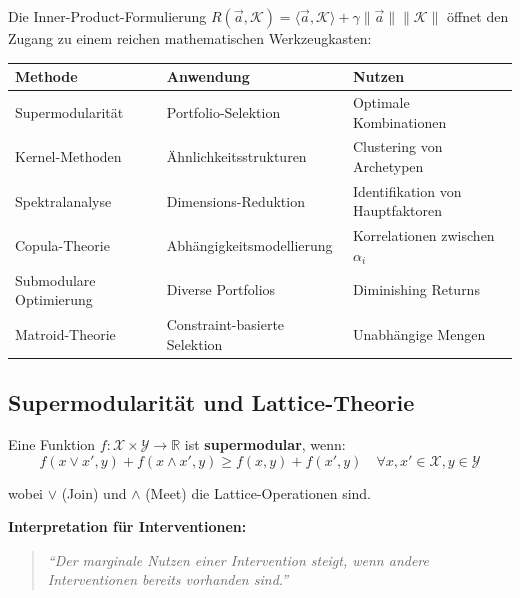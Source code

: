 \begin{tcolorbox}[colback=blue!5!white, colframe=blue!75!black,
    title=\textbf{Überblick: Mathematische Werkzeuge}]

Die Inner-Product-Formulierung $R(\vec{a}, \mathcal{K}) = \langle \vec{a}, \mathcal{K} \rangle + \gamma \|\vec{a}\| \|\mathcal{K}\|$ öffnet den Zugang zu einem reichen mathematischen Werkzeugkasten:

\begin{center}
\begin{tabular}{@{}lll@{}}
\toprule
\textbf{Methode} & \textbf{Anwendung} & \textbf{Nutzen} \\
\midrule
Supermodularität & Portfolio-Selektion & Optimale Kombinationen \\
Kernel-Methoden & Ähnlichkeitsstrukturen & Clustering von Archetypen \\
Spektralanalyse & Dimensions-Reduktion & Identifikation von Hauptfaktoren \\
Copula-Theorie & Abhängigkeitsmodellierung & Korrelationen zwischen $\alpha_i$ \\
Submodulare Optimierung & Diverse Portfolios & Diminishing Returns \\
Matroid-Theorie & Constraint-basierte Selektion & Unabhängige Mengen \\
\bottomrule
\end{tabular}
\end{center}

\end{tcolorbox}

\subsection{Supermodularität und Lattice-Theorie}

\begin{tcolorbox}[colback=gray!5!white, colframe=gray!75!black,
    title=\textbf{Definition: Supermodularität (Topkis 1978, Milgrom \& Roberts 1990)}]

Eine Funktion $f: \mathcal{X} \times \mathcal{Y} \rightarrow \mathbb{R}$ ist \textbf{supermodular}, wenn:
\begin{equation}
f(x \vee x', y) + f(x \wedge x', y) \geq f(x, y) + f(x', y) \quad \forall x, x' \in \mathcal{X}, y \in \mathcal{Y}
\end{equation}

wobei $\vee$ (Join) und $\wedge$ (Meet) die Lattice-Operationen sind.

\textbf{Interpretation für Interventionen:}
\begin{quote}
\textit{``Der marginale Nutzen einer Intervention steigt, wenn andere Interventionen bereits vorhanden sind.''}
\end{quote}

\end{tcolorbox}

